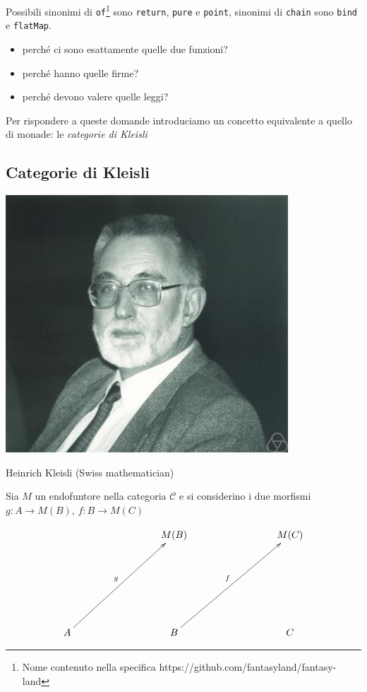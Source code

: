 \documentclass[12pt]{article}
\theoremstyle{definition}
\begin{document}
Possibili sinonimi di \texttt{of}\footnote{Nome contenuto nella specifica https://github.com/fantasyland/fantasy-land} sono \texttt{return}, \texttt{pure} e \texttt{point}, sinonimi di \texttt{chain} sono \texttt{bind} e \texttt{flatMap}.

\begin{itemize}
  \item perché ci sono esattamente quelle due funzioni?
  \item perché hanno quelle firme?
  \item perché devono valere quelle leggi?
\end{itemize}

Per rispondere a queste domande introduciamo un concetto equivalente a quello di monade: le \emph{categorie di Kleisli}

\subsection{Categorie di Kleisli}

\begin{center}
\includegraphics[scale=0.5]{kleisli}

Heinrich Kleisli (Swiss mathematician)
\end{center}

Sia $M$ un endofuntore nella categoria $\mathcal{C}$ e si considerino i due morfismi $g: A \rightarrow M(B)$, $f: B \rightarrow M(C)$

\[
\xymatrixrowsep{3cm}
\xymatrixcolsep{3cm}
\xymatrix{
  & M(B) & M(C) \\
  A \ar[ur]^g & B \ar[ur]^f & C
}
\]
\end{document}
